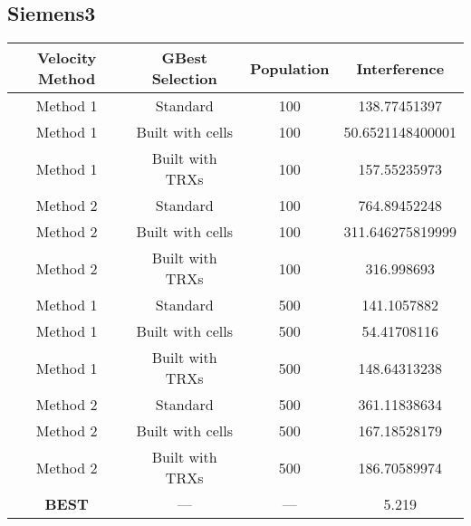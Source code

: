 \subsection{Siemens3}
\begin{center}
	\begin{tabular}{| c | c | c | c |}
	\hline
	Velocity Method & GBest Selection & Population & Interference\\ \hline
	Method 1 & Standard & 100 & 138.77451397\\ \hline
	Method 1 & Built with cells & 100 & 50.6521148400001\\ \hline
	Method 1 & Built with TRXs & 100 & 157.55235973\\ \hline
	Method 2 & Standard & 100 & 764.89452248\\ \hline
	Method 2 & Built with cells & 100 & 311.646275819999\\ \hline
	Method 2 & Built with TRXs & 100 & 316.998693\\ \hline
	Method 1 & Standard & 500 & 141.1057882\\ \hline
	Method 1 & Built with cells & 500 & 54.41708116\\ \hline
	Method 1 & Built with TRXs & 500 & 148.64313238\\ \hline
	Method 2 & Standard & 500 & 361.11838634\\ \hline
	Method 2 & Built with cells & 500 & 167.18528179\\ \hline
	Method 2 & Built with TRXs & 500 & 186.70589974\\ \hline
	\textbf{BEST} & --- & --- & 5.219 \\ \hline
	\end{tabular}
\end{center}
